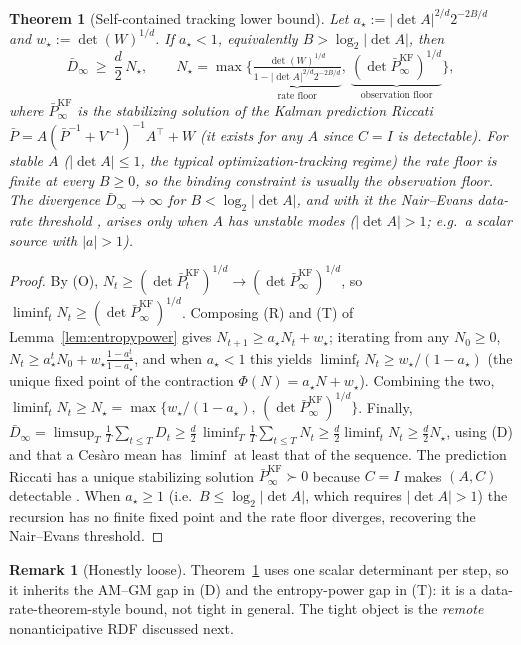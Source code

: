 \documentclass[11pt]{article}
\newtheorem{theorem}{Theorem}
\theoremstyle{definition}
\newtheorem{remark}{Remark}
\begin{document}
\begin{theorem}[Self-contained tracking lower bound]
\label{thm:seqlb}
Let $a_\star:=|\det A|^{2/d}2^{-2B/d}$ and $w_\star:=\det(W)^{1/d}$. If $a_\star<1$, equivalently
$B>\log_2|\det A|$, then
\[
\bar D_\infty\ \ge\ \frac d2\,N_\star,\qquad
N_\star=\max\Big\{\underbrace{\tfrac{\det(W)^{1/d}}{1-|\det A|^{2/d}2^{-2B/d}}}_{\text{rate floor}},\ \underbrace{(\det\bar P^{\mathrm{KF}}_\infty)^{1/d}}_{\text{observation floor}}\Big\},
\]
where $\bar P^{\mathrm{KF}}_\infty$ is the stabilizing solution of the Kalman prediction Riccati
$\bar P=A(\bar P^{-1}+V^{-1})^{-1}A^\top+W$ (it exists for any $A$ since $C=I$ is detectable). For stable
$A$ ($|\det A|\le1$, the typical optimization-tracking regime) the rate floor is finite at every
$B\ge0$, so the binding constraint is usually the observation floor. The divergence
$\bar D_\infty\to\infty$ for $B<\log_2|\det A|$, and with it the Nair--Evans data-rate threshold
\citep{nair2004stabilizability}, arises only when $A$ has unstable modes ($|\det A|>1$; e.g.\ a scalar
source with $|a|>1$).
\end{theorem}
\begin{proof}
By (O), $N_t\ge(\det\bar P^{\mathrm{KF}}_t)^{1/d}\to(\det\bar P^{\mathrm{KF}}_\infty)^{1/d}$, so
$\liminf_t N_t\ge(\det\bar P^{\mathrm{KF}}_\infty)^{1/d}$. Composing (R) and (T) of
Lemma~\ref{lem:entropypower} gives $N_{t+1}\ge a_\star N_t+w_\star$; iterating from any $N_0\ge0$,
$N_t\ge a_\star^{t}N_0+w_\star\frac{1-a_\star^{t}}{1-a_\star}$, and when $a_\star<1$ this yields
$\liminf_t N_t\ge w_\star/(1-a_\star)$ (the unique fixed point of the contraction
$\Phi(N)=a_\star N+w_\star$). Combining the two,
$\liminf_t N_t\ge N_\star=\max\{w_\star/(1-a_\star),\,(\det\bar P^{\mathrm{KF}}_\infty)^{1/d}\}$. Finally,
$\bar D_\infty=\limsup_T\frac1T\sum_{t\le T}D_t\ge\frac d2\,\liminf_T\frac1T\sum_{t\le T}N_t\ge\frac d2\liminf_t N_t\ge\frac d2 N_\star$,
using (D) and that a Cesàro mean has $\liminf$ at least that of the sequence. The prediction Riccati has
a unique stabilizing solution $\bar P^{\mathrm{KF}}_\infty\succ0$ because $C=I$ makes $(A,C)$ detectable
\citep{andersonmoore1979}. When $a_\star\ge1$ (i.e.\ $B\le\log_2|\det A|$, which requires
$|\det A|>1$) the recursion has no finite fixed point and the rate floor diverges, recovering the
Nair--Evans threshold.
\end{proof}

\begin{remark}[Honestly loose]
\label{rem:loose}
Theorem~\ref{thm:seqlb} uses one scalar determinant per step, so it inherits the AM--GM gap in (D) and
the entropy-power gap in (T): it is a data-rate-theorem-style bound, not tight in general. The tight
object is the \emph{remote} nonanticipative RDF discussed next.
\end{remark}
\end{document}
